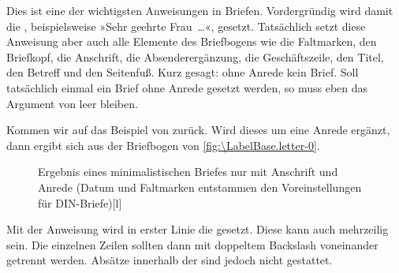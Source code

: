 \begin{Declaration}
\end{Declaration}
Dies ist eine der wichtigsten Anweisungen in Briefen.  Vordergründig
wird damit die , beispielsweise »Sehr
geehrte Frau~\dots«, gesetzt. Tatsächlich setzt diese
Anweisung aber auch alle Elemente des Briefbogens wie die
Faltmarken, den Briefkopf, die
Anschrift, die Absenderergänzung, die
Geschäftszeile, den Titel,
den Betreff und den
Seitenfuß. Kurz
gesagt: ohne Anrede kein Brief. Soll tatsächlich einmal ein Brief ohne Anrede
gesetzt werden, so muss eben das Argument von  leer bleiben.

\begin{Example}
  Kommen wir auf das Beispiel von
   zurück. Wird dieses
  um eine Anrede ergänzt, dann ergibt sich aus
  der Briefbogen von \autoref{fig:\LabelBase.letter-0}.
  \begin{figure}
    \setcapindent{0pt}%
    \begin{captionbeside}{Ergebnis eines minimalistischen Briefes nur mit
        Anschrift und Anrede (Datum und Faltmarken entstammen den
        Voreinstellungen für DIN-Briefe)}[l]
    \end{captionbeside}
    \label{fig:\LabelBase.letter-0}
  \end{figure}
\end{Example}
\iffalse %
\begin{Explain}
  Bei\textnote{Tipp!} maschinell erstellten Briefen wurde früher meist auf
  eine Anrede verzichtet, da individualisierte Serienbriefe kaum möglich
  waren. Heute sind persönliche Anreden auch bei Massensendungen üblich.%
\end{Explain}%
\fi
\EndIndexGroup


\begin{Declaration}
\end{Declaration}
Mit der Anweisung  wird in erster Linie die
gesetzt. Diese kann auch mehrzeilig sein. Die einzelnen Zeilen sollten dann
mit doppeltem Backslash voneinander getrennt werden.  Absätze innerhalb der
 sind jedoch nicht gestattet.

